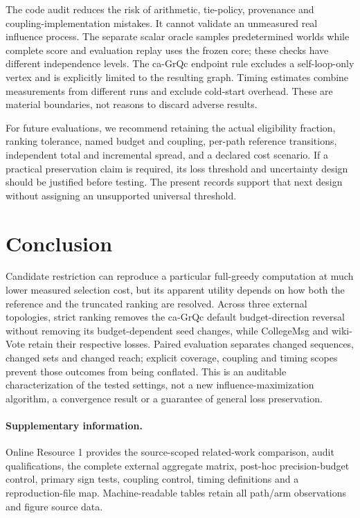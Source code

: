 \documentclass[smallextended]{svjour3}
\begin{document}
The code audit reduces the risk of arithmetic, tie-policy, provenance and coupling-implementation mistakes. It cannot validate an unmeasured real influence process. The separate scalar oracle samples predetermined worlds while complete score and evaluation replay uses the frozen core; these checks have different independence levels. The ca-GrQc endpoint rule excludes a self-loop-only vertex and is explicitly limited to the resulting graph. Timing estimates combine measurements from different runs and exclude cold-start overhead. These are material boundaries, not reasons to discard adverse results.

For future evaluations, we recommend retaining the actual eligibility fraction, ranking tolerance, named budget and coupling, per-path reference transitions, independent total and incremental spread, and a declared cost scenario. If a practical preservation claim is required, its loss threshold and uncertainty design should be justified before testing. The present records support that next design without assigning an unsupported universal threshold.

\section{Conclusion}
Candidate restriction can reproduce a particular full-greedy computation at much lower measured selection cost, but its apparent utility depends on how both the reference and the truncated ranking are resolved. Across three external topologies, strict ranking removes the ca-GrQc default budget-direction reversal without removing its budget-dependent seed changes, while CollegeMsg and wiki-Vote retain their respective losses. Paired evaluation separates changed sequences, changed sets and changed reach; explicit coverage, coupling and timing scopes prevent those outcomes from being conflated. This is an auditable characterization of the tested settings, not a new influence-maximization algorithm, a convergence result or a guarantee of general loss preservation.

\paragraph{Supplementary information.} Online Resource 1 provides the source-scoped related-work comparison, audit qualifications, the complete external aggregate matrix, post-hoc precision-budget control, primary sign tests, coupling control, timing definitions and a reproduction-file map. Machine-readable tables retain all path/arm observations and figure source data.
\end{document}
